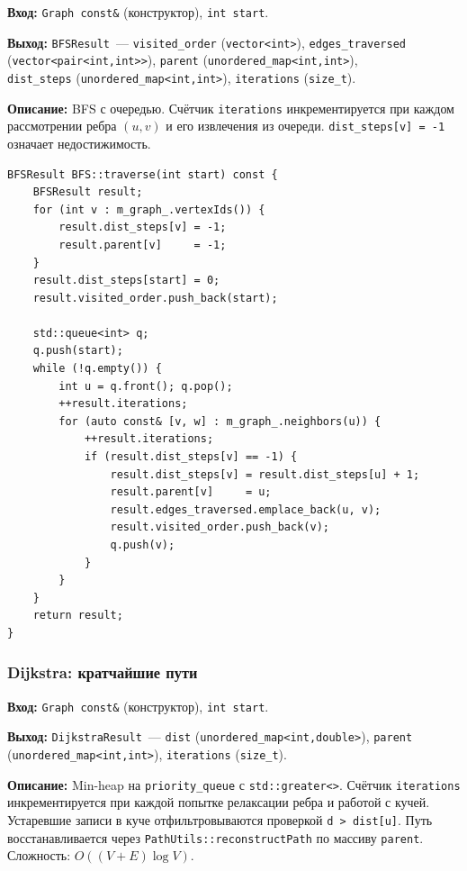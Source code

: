 \textbf{Вход:} \texttt{Graph const\&} (конструктор), \texttt{int start}.

\textbf{Выход:} \texttt{BFSResult}~--- \texttt{visited\_order}
(\texttt{vector<int>}), \texttt{edges\_traversed}
(\texttt{vector<pair<int,int>>}), \texttt{parent}
(\texttt{unordered\_map<int,int>}), \\ \texttt{dist\_steps}
(\texttt{unordered\_map<int,int>}), \texttt{iterations} (\texttt{size\_t}).

\textbf{Описание:} BFS с очередью. Счётчик
\texttt{iterations} инкрементируется при каждом рассмотрении ребра $(u, v)$ и его извлечения из очереди. \texttt{dist\_steps[v] = -1}
означает недостижимость.

\begin{lstlisting}[style=cppstyle, caption={Обход рёбер в ширину (BFS.cc)}]
BFSResult BFS::traverse(int start) const {
    BFSResult result;
    for (int v : m_graph_.vertexIds()) {
        result.dist_steps[v] = -1;
        result.parent[v]     = -1;
    }
    result.dist_steps[start] = 0;
    result.visited_order.push_back(start);

    std::queue<int> q;
    q.push(start);
    while (!q.empty()) {
        int u = q.front(); q.pop();
        ++result.iterations;
        for (auto const& [v, w] : m_graph_.neighbors(u)) {
            ++result.iterations;
            if (result.dist_steps[v] == -1) {
                result.dist_steps[v] = result.dist_steps[u] + 1;
                result.parent[v]     = u;
                result.edges_traversed.emplace_back(u, v);
                result.visited_order.push_back(v);
                q.push(v);
            }
        }
    }
    return result;
}
\end{lstlisting}

\subsubsection{Dijkstra: кратчайшие пути}

\textbf{Вход:} \texttt{Graph const\&} (конструктор), \texttt{int start}.

\textbf{Выход:} \texttt{DijkstraResult}~--- \texttt{dist}
(\texttt{unordered\_map<int,double>}), \texttt{parent}
(\texttt{unordered\_map<int,int>}), \texttt{iterations} (\texttt{size\_t}).

\textbf{Описание:} Min-heap на \texttt{priority\_queue} с
\texttt{std::greater<>}. Счётчик \texttt{iterations} инкрементируется
при каждой попытке релаксации ребра и работой с кучей. Устаревшие записи в
куче отфильтровываются проверкой \texttt{d > dist[u]}.
Путь восстанавливается через \texttt{PathUtils::reconstructPath}
по массиву \texttt{parent}. Сложность: $O((V+E)\log{V})$.

